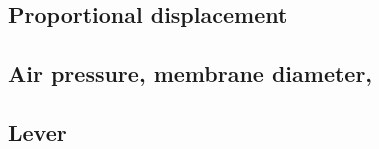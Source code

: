\subsection{Proportional displacement}
\label{sub:displacement}


\subsection{Air pressure, membrane diameter, }
\label{sub:pressure-diameter}

\subsection{Lever}
\label{sub:lever}

